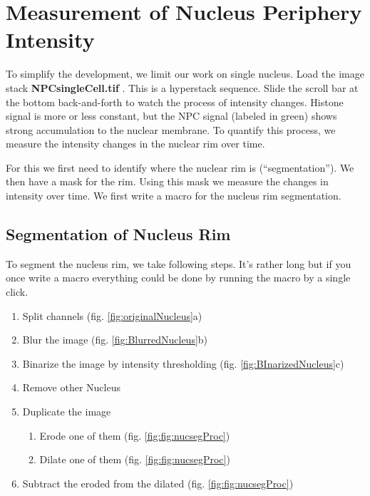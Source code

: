 \section{Measurement of Nucleus Periphery Intensity}

To simplify the development, we limit our work on single nucleus. Load the image stack \textbf{NPCsingleCell.tif} . This is a hyperstack sequence. Slide the scroll bar at the bottom back-and-forth to watch the process of intensity changes. Histone signal is more or less constant, but the NPC signal (labeled in green) shows strong accumulation to the nuclear membrane. To quantify this process, we measure the intensity changes in the nuclear rim over time.

For this we first need to identify where the nuclear rim is (``segmentation''). We then have a mask for the rim. Using this mask we measure the changes in intensity over time. We first write a macro for the nucleus rim segmentation.

\subsection{Segmentation of Nucleus Rim}

To segment the nucleus rim, we take following steps. It's rather long but if you once write a macro everything could be done by running the macro by a single click.

\begin{enumerate}
  \item Split channels (fig. \ref{fig:originalNucleus}a)
  \item Blur the image (fig. \ref{fig:BlurredNucleus}b)
  \item Binarize the image by intensity thresholding (fig. \ref{fig:BInarizedNucleus}c)
  \item Remove other Nucleus
  \item Duplicate the image
  \begin{enumerate}
    \item Erode one of them (fig. \ref{fig:fig:nucsegProc})
    \item Dilate one of them (fig. \ref{fig:fig:nucsegProc})
  \end{enumerate}
  \item Subtract the eroded from the dilated (fig. \ref{fig:fig:nucsegProc})
\end{enumerate}